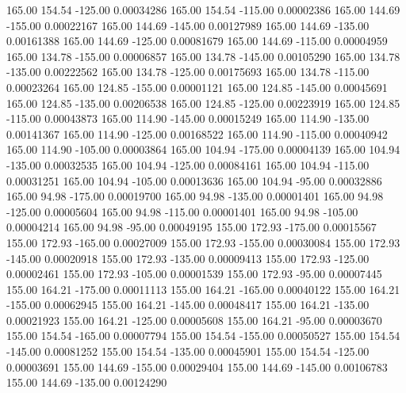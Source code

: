     165.00    154.54   -125.00     0.00034286
    165.00    154.54   -115.00     0.00002386
    165.00    144.69   -155.00     0.00022167
    165.00    144.69   -145.00     0.00127989
    165.00    144.69   -135.00     0.00161388
    165.00    144.69   -125.00     0.00081679
    165.00    144.69   -115.00     0.00004959
    165.00    134.78   -155.00     0.00006857
    165.00    134.78   -145.00     0.00105290
    165.00    134.78   -135.00     0.00222562
    165.00    134.78   -125.00     0.00175693
    165.00    134.78   -115.00     0.00023264
    165.00    124.85   -155.00     0.00001121
    165.00    124.85   -145.00     0.00045691
    165.00    124.85   -135.00     0.00206538
    165.00    124.85   -125.00     0.00223919
    165.00    124.85   -115.00     0.00043873
    165.00    114.90   -145.00     0.00015249
    165.00    114.90   -135.00     0.00141367
    165.00    114.90   -125.00     0.00168522
    165.00    114.90   -115.00     0.00040942
    165.00    114.90   -105.00     0.00003864
    165.00    104.94   -175.00     0.00004139
    165.00    104.94   -135.00     0.00032535
    165.00    104.94   -125.00     0.00084161
    165.00    104.94   -115.00     0.00031251
    165.00    104.94   -105.00     0.00013636
    165.00    104.94    -95.00     0.00032886
    165.00     94.98   -175.00     0.00019700
    165.00     94.98   -135.00     0.00001401
    165.00     94.98   -125.00     0.00005604
    165.00     94.98   -115.00     0.00001401
    165.00     94.98   -105.00     0.00004214
    165.00     94.98    -95.00     0.00049195
    155.00    172.93   -175.00     0.00015567
    155.00    172.93   -165.00     0.00027009
    155.00    172.93   -155.00     0.00030084
    155.00    172.93   -145.00     0.00020918
    155.00    172.93   -135.00     0.00009413
    155.00    172.93   -125.00     0.00002461
    155.00    172.93   -105.00     0.00001539
    155.00    172.93    -95.00     0.00007445
    155.00    164.21   -175.00     0.00011113
    155.00    164.21   -165.00     0.00040122
    155.00    164.21   -155.00     0.00062945
    155.00    164.21   -145.00     0.00048417
    155.00    164.21   -135.00     0.00021923
    155.00    164.21   -125.00     0.00005608
    155.00    164.21    -95.00     0.00003670
    155.00    154.54   -165.00     0.00007794
    155.00    154.54   -155.00     0.00050527
    155.00    154.54   -145.00     0.00081252
    155.00    154.54   -135.00     0.00045901
    155.00    154.54   -125.00     0.00003691
    155.00    144.69   -155.00     0.00029404
    155.00    144.69   -145.00     0.00106783
    155.00    144.69   -135.00     0.00124290
